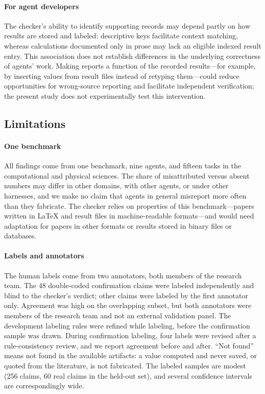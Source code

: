 \documentclass[preprint,12pt,authoryear]{elsarticle}
\begin{document}
\paragraph{For agent developers} The checker's ability to identify supporting records may depend partly on how results are stored and labeled: descriptive keys facilitate context matching, whereas calculations documented only in prose may lack an eligible indexed result entry. This association does not establish differences in the underlying correctness of agents' work. Making reports a function of the recorded results---for example, by inserting values from result files instead of retyping them---could reduce opportunities for wrong-source reporting and facilitate independent verification; the present study does not experimentally test this intervention.

\subsection{Limitations}

\paragraph{One benchmark} All findings come from one benchmark, nine agents, and fifteen tasks in the computational and physical sciences. The share of misattributed versus absent numbers may differ in other domains, with other agents, or under other harnesses, and we make no claim that agents in general misreport more often than they fabricate. The checker relies on properties of this benchmark---papers written in \LaTeX{} and result files in machine-readable formats---and would need adaptation for papers in other formats or results stored in binary files or databases.

\paragraph{Labels and annotators} The human labels come from two annotators, both members of the research team. The 48 double-coded confirmation claims were labeled independently and blind to the checker's verdict; other claims were labeled by the first annotator only. Agreement was high on the overlapping subset, but both annotators were members of the research team and not an external validation panel. The development labeling rules were refined while labeling, before the confirmation sample was drawn. During confirmation labeling, four labels were revised after a rule-consistency review, and we report agreement before and after. ``Not found'' means not found in the available artifacts: a value computed and never saved, or quoted from the literature, is not fabricated. The labeled samples are modest (256 claims, 60 real claims in the held-out set), and several confidence intervals are correspondingly wide.
\end{document}
